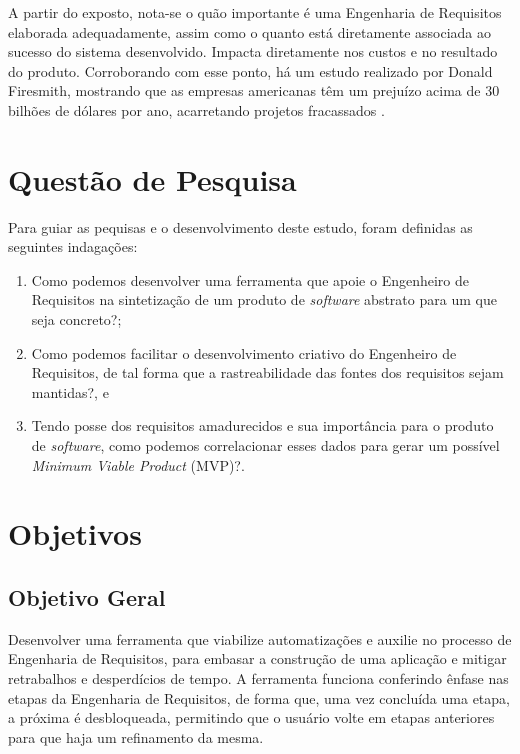 A partir do exposto, nota-se o quão importante é uma Engenharia de Requisitos elaborada adequadamente, assim como o quanto está diretamente associada ao sucesso do sistema desenvolvido. Impacta diretamente nos custos e no resultado do produto. Corroborando com esse ponto, há um estudo realizado por Donald Firesmith, mostrando que as empresas americanas têm um prejuízo acima de 30 bilhões de dólares por ano, acarretando projetos fracassados \cite{king2008cost}.

\section{Questão de Pesquisa}

\label{ref:questao_pesquisa}

Para guiar as pequisas e o desenvolvimento deste estudo, foram definidas as seguintes indagações:

\begin{enumerate}
    \item Como podemos desenvolver uma ferramenta que apoie o Engenheiro de Requisitos na sintetização de um produto de \textit{software} abstrato para um que seja concreto?;
    \item Como podemos facilitar o desenvolvimento criativo do Engenheiro de Requisitos, de tal forma que a rastreabilidade das fontes dos requisitos sejam mantidas?, e
    \item Tendo posse dos requisitos amadurecidos e sua importância para o produto de \textit{software}, como podemos correlacionar esses dados para gerar um possível \textit{Minimum Viable Product} (MVP)?.
\end{enumerate}

\section{Objetivos}

\label{ref:objetivos}

\subsection{Objetivo Geral}

Desenvolver uma ferramenta que viabilize automatizações e auxilie no processo de Engenharia de Requisitos, para embasar a construção de uma aplicação e mitigar retrabalhos e desperdícios de tempo. A ferramenta funciona conferindo ênfase nas etapas da Engenharia de Requisitos, de forma que, uma vez concluída uma etapa, a próxima é desbloqueada, permitindo que o usuário volte em etapas anteriores para que haja um refinamento da mesma.

